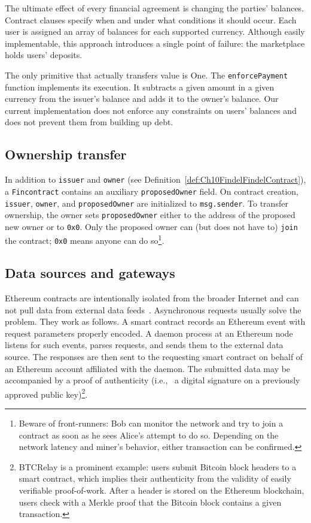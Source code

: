 The ultimate effect of every financial agreement is changing the parties' balances.
Contract clauses specify when and under what conditions it should occur.
Each user is assigned an array of balances for each supported currency.
Although easily implementable, this approach introduces a single point of failure: the marketplace holds users' deposits.

The only primitive that actually transfers value is \(\mathrm{One}\).
The \texttt{enforcePayment} function implements its execution.
It subtracts a given amount in a given currency from the issuer's balance and adds it to the owner's balance.
Our current implementation does not enforce any constraints on users' balances and does not prevent them from building up debt.


\subsection{Ownership transfer}

In addition to \texttt{issuer} and \texttt{owner} (see Definition~\ref{def:Ch10FindelFindelContract}), a \texttt{Fincontract} contains an auxiliary \texttt{proposedOwner} field.
On contract creation, \texttt{issuer}, \texttt{owner}, and \texttt{proposedOwner} are initialized to \texttt{msg.sender}.
To transfer ownership, the owner sets \texttt{proposedOwner} either to the address of the proposed new owner or to \texttt{0x0}.
Only the proposed owner can (but does not have to) \texttt{join} the contract; \texttt{0x0} means anyone can do so\footnote{Beware of front-runners: Bob can monitor the network and try to join a contract as soon as he sees Alice's attempt to do so. Depending on the network latency and miner's behavior, either transaction can be confirmed.}.


\subsection{Data sources and gateways} \label{def:Ch10FindelGateways}

Ethereum contracts are intentionally isolated from the broader Internet and can not pull data from external data feeds~\cite{Greenspan2016}.
Asynchronous requests usually solve the problem.
They work as follows.
A smart contract records an Ethereum event with request parameters properly encoded.
A daemon process at an Ethereum node listens for such events, parses requests, and sends them to the external data source.
The responses are then sent to the requesting smart contract on behalf of an Ethereum account affiliated with the daemon.
The submitted data may be accompanied by a proof of authenticity (i.e.,~ a digital signature on a previously approved public key)\footnote{BTCRelay is a prominent example: users submit Bitcoin block headers to a smart contract, which implies their authenticity from the validity of easily verifiable proof-of-work. After a header is stored on the Ethereum blockchain, users check with a Merkle proof that the Bitcoin block contains a given transaction.}.

